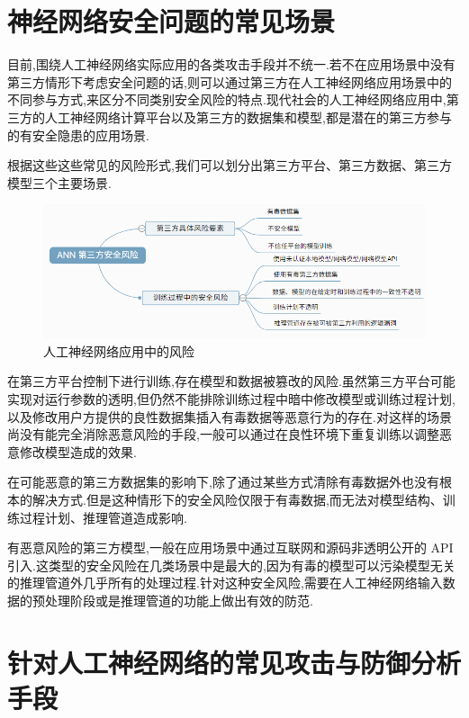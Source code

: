 \section{神经网络安全问题的常见场景}

目前,围绕人工神经网络实际应用的各类攻击手段并不统一.若不在应用场景中没有第三方情形下考虑安全问题的话,则可以通过第三方在人工神经网络应用场景中的不同参与方式,来区分不同类别安全风险的特点.现代社会的人工神经网络应用中,第三方的人工神经网络计算平台以及第三方的数据集和模型,都是潜在的第三方参与的有安全隐患的应用场景.

根据这些这些常见的风险形式,我们可以划分出第三方平台、第三方数据、第三方模型三个主要场景.

\begin{figure}[H]
	\centering
	\includegraphics[scale=0.7]{Figures/situation.png}
	\caption{人工神经网络应用中的风险}
\end{figure}

在第三方平台控制下进行训练,存在模型和数据被篡改的风险.虽然第三方平台可能实现对运行参数的透明,但仍然不能排除训练过程中暗中修改模型或训练过程计划,以及修改用户方提供的良性数据集插入有毒数据等恶意行为的存在.对这样的场景尚没有能完全消除恶意风险的手段,一般可以通过在良性环境下重复训练以调整恶意修改模型造成的效果.

在可能恶意的第三方数据集的影响下,除了通过某些方式清除有毒数据外也没有根本的解决方式.但是这种情形下的安全风险仅限于有毒数据,而无法对模型结构、训练过程计划、推理管道造成影响.

有恶意风险的第三方模型,一般在应用场景中通过互联网和源码非透明公开的 API 引入.这类型的安全风险在几类场景中是最大的,因为有毒的模型可以污染模型无关的推理管道外几乎所有的处理过程.针对这种安全风险,需要在人工神经网络输入数据的预处理阶段或是推理管道的功能上做出有效的防范.

\section{针对人工神经网络的常见攻击与防御分析手段}

